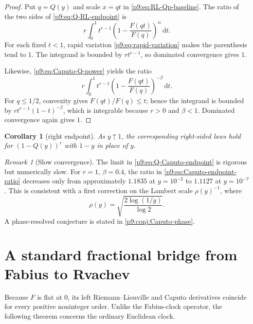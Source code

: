 \documentclass[11pt,oneside]{article}
\newtheorem{corollary}[theorem]{Corollary}
\theoremstyle{definition}
\theoremstyle{remark}
\newtheorem{remark}[theorem]{Remark}
\newcommand{\dd}{\,\mathrm d}
\newcommand{\1}{\mathbf 1}
\begin{document}
\begin{proof}
Put $q=Q(y)$ and scale $x=qt$ in
\cref{p9:eq:RL-Qp-baseline}.  The ratio of the two sides of
\cref{p9:eq:Q-RL-endpoint} is
\begin{equation}
 r\int_0^1t^{r-1}
 \left(1-\frac{F(qt)}{F(q)}\right)^\alpha\dd t.
 \label{p9:eq:RL-endpoint-ratio}
\end{equation}
For each fixed $t<1$, rapid variation \cref{p9:eq:rapid-variation} makes the
parenthesis tend to $1$.  The integrand is bounded by $rt^{r-1}$, so dominated
convergence gives $1$.

Likewise, \cref{p9:eq:Caputo-Q-power} yields the ratio
\begin{equation}
 r\int_0^1t^{r-1}
 \left(1-\frac{F(qt)}{F(q)}\right)^{-\beta}\dd t.
 \label{p9:eq:Caputo-endpoint-ratio}
\end{equation}
For $q\le1/2$, convexity gives $F(qt)/F(q)\le t$; hence the integrand is bounded
by $rt^{r-1}(1-t)^{-\beta}$, which is integrable because $r>0$ and
$\beta<1$.  Dominated convergence again gives $1$.
\end{proof}

\begin{corollary}[right endpoint]
As $y\uparrow1$, the corresponding right-sided laws hold for
$(1-Q(y))^r$ with $1-y$ in place of $y$.
\end{corollary}

\begin{remark}[Slow convergence]
The limit in \cref{p9:eq:Q-Caputo-endpoint} is rigorous but numerically slow.
For $r=1$, $\beta=0.4$, the ratio in
\cref{p9:eq:Caputo-endpoint-ratio} decreases only from approximately $1.1835$ at
$y=10^{-2}$ to $1.1127$ at $y=10^{-7}$.  This is consistent with a first
correction on the Lambert scale $\rho(y)^{-1}$, where
\begin{equation}
 \rho(y)=\sqrt{\frac{2\log(1/y)}{\log2}}.
 \label{p9:eq:rho-y}
\end{equation}
A phase-resolved conjecture is stated in \cref{p9:conj:Caputo-phase}.
\end{remark}

\section{A standard fractional bridge from Fabius to Rvachev}
\label{p9:sec:F-up-bridge}

Because $F$ is flat at $0$, its left Riemann--Liouville and Caputo derivatives
coincide for every positive noninteger order.  Unlike the Fabius-clock
operator, the following theorem concerns the ordinary Euclidean clock.
\end{document}
